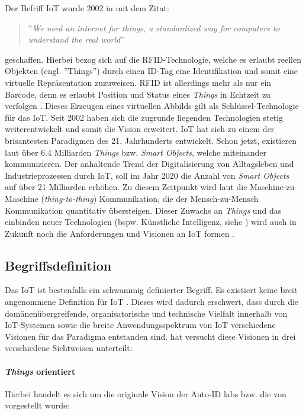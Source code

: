 Der Befriff \ac{IoT} wurde 2002 in \cite{ashton2009internet} mit dem Zitat:
\begin{quote}
    ''\textit{We need an internet for things, a standardized way for computers to understand the real world}''
\end{quote}
 geschaffen. Hierbei bezog sich \cite{ashton2009internet} auf die RFID-Technologie, welche es erlaubt reellen Objekten (engl. ''Things'') durch einen ID-Tag eine Identifikation und somit eine virtuelle Repräsentation zuzuweisen. RFID ist allerdings mehr als nur ein Barcode, denn es erlaubt Position und Status eines \textit{Things} in Echtzeit zu verfolgen \cite{atzori2010internet}. Dieses Erzeugen eines virtuellen Abbilds gilt als Schlüssel-Technologie für das \ac{IoT}. Seit 2002 haben sich die zugrunde liegenden Technologien stetig weiterentwickelt und somit die Vision erweitert. \ac{IoT} hat sich zu einem der brisantesten Paradigmen des 21. Jahrhunderts entwickelt. Schon jetzt, existieren laut \cite{gartnerIoT} über 6.4 Milliarden \textit{Things} bzw. \textit{Smart Objects}, welche miteinander kommunizieren. Der anhaltende Trend der Digitalisierung von Alltagsleben und Industrieprozessen durch \ac{IoT}, soll im Jahr 2020 die Anzahl von \textit{Smart Objects} auf über 21 Milliarden erhöhen. Zu diesem Zeitpunkt wird laut \cite{tan2010future} die Maschine-zu-Maschine (\textit{thing-to-thing}) Kommunikation, die der Mensch-zu-Mensch Kommunikation quantitativ übersteigen. Dieser Zuwachs an \textit{Things} und das einbinden neuer Technologien (bspw. Künstliche Intelligenz, siehe \cite{mehdi2017deeplearningIoT}) wird auch in Zukunft noch die Anforderungen und Visionen an \ac{IoT} formen \cite{Gubbi.2013}.
 
\subsection{Begriffsdefinition}
Das \acl{IoT} ist bestenfalls ein schwammig definierter Begriff. Es existiert keine breit angenommene Definition für \ac{IoT} \cite{atzori2010internet}. Dieses wird dadurch erschwert, dass durch die domänenübergreifende, organisatorische und technische Vielfalt innerhalb von \ac{IoT}-Systemen sowie die breite Anwendungsspektrum von \ac{IoT} verschiedene Visionen für das Paradigma entstanden sind. \cite{atzori2010internet} hat versucht diese Visionen in drei verschiedene Sichtweisen unterteilt: 

\paragraph{\textit{Things} orientiert} Hierbei handelt es sich um die originale Vision der Auto-ID labs bzw. die von \cite{sarma2000networked} vorgestellt wurde:

